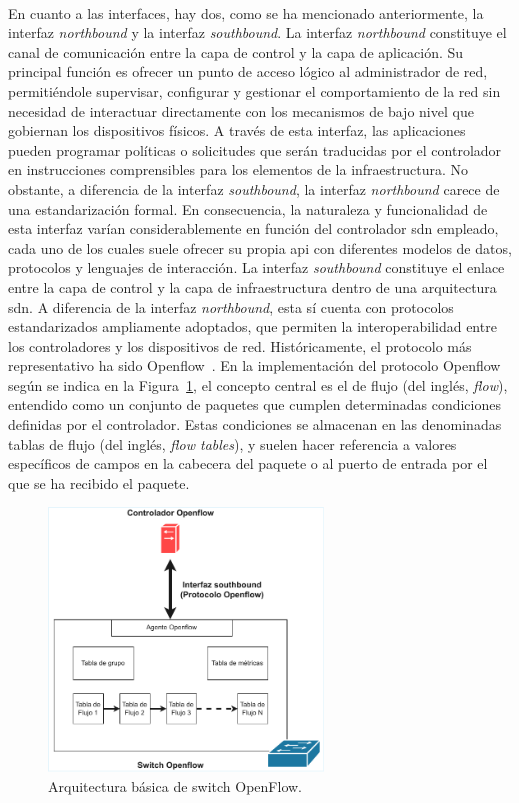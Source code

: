 \\
En cuanto a las interfaces, hay dos, como se ha mencionado anteriormente, la interfaz \textit{northbound} y la interfaz \textit{southbound}. La interfaz \textit{northbound} constituye el canal de comunicación entre la capa de control y la capa de aplicación. Su principal función es ofrecer un punto de acceso lógico al administrador de red, permitiéndole supervisar, configurar y gestionar el comportamiento de la red sin necesidad de interactuar directamente con los mecanismos de bajo nivel que gobiernan los dispositivos físicos. A través de esta interfaz, las aplicaciones pueden programar políticas o solicitudes que serán traducidas por el controlador en instrucciones comprensibles para los elementos de la infraestructura. No obstante, a diferencia de la interfaz \textit{southbound}, la interfaz \textit{northbound} carece de una estandarización formal. En consecuencia, la naturaleza y funcionalidad de esta interfaz varían considerablemente en función del controlador \gls{sdn} empleado, cada uno de los cuales suele ofrecer su propia \gls{api} con diferentes modelos de datos, protocolos y lenguajes de interacción. La interfaz \textit{southbound} constituye el enlace entre la capa de control y la capa de infraestructura dentro de una arquitectura \gls{sdn}. A diferencia de la interfaz \textit{northbound}, esta sí cuenta con protocolos estandarizados ampliamente adoptados, que permiten la interoperabilidad entre los controladores y los dispositivos de red. Históricamente, el protocolo más representativo ha sido Openflow~\cite{mckeown2008openflow}. En la implementación del protocolo Openflow según se indica en la Figura~\ref{fig:sdn_openflow}, el concepto central es el de flujo (del inglés, \textit{flow}), entendido como un conjunto de paquetes que cumplen determinadas condiciones definidas por el controlador. Estas condiciones se almacenan en las denominadas tablas de flujo (del inglés, \textit{flow tables}), y suelen hacer referencia a valores específicos de campos en la cabecera del paquete o al puerto de entrada por el que se ha recibido el paquete.

\begin{figure}[ht!]
\centering
\includegraphics[width=0.65\textwidth]{fig/02_sota/sota_3_sdn_openflow.drawio.pdf}
\caption{Arquitectura básica de switch OpenFlow.}
\label{fig:sdn_openflow}
\end{figure}

